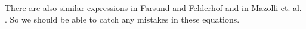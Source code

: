 \documentclass[aps,prl,twocolumn]{revtex4-1}
\begin{document}
There are also similar expressions in Farsund and Felderhof
 \cite{farsund_force_1996} and in Mazolli et. al. \cite{mazolli_theory_2003}.
So we should be able to catch any mistakes in these equations.


%
%

%

\end{document}
